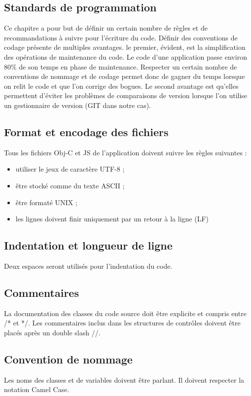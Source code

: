 \documentclass[a4paper,12pt]{report}
\begin{document}
\begin{onehalfspace}
\chapter{Standards de programmation}

Ce chapitre a pour but de définir un certain nombre de règles et de recommandations à suivre pour l'écriture du code. Définir des conventions de codage présente de multiples avantages. le premier, évident, est la simplification des opérations de maintenance du code. Le code d'une application passe environ 80\% de son temps en phase de maintenance. Respecter un certain nombre de conventions de nommage et de codage permet donc de gagner du temps lorsque on relit le code et que l'on corrige des bogues. Le second avantage est qu'elles permettent d'éviter les problèmes de comparaisons de version lorsque l'on utilise un gestionnaire de version (GIT dans notre cas).

\section{Format et encodage des fichiers}

Tous les fichiers Obj-C et JS de l'application doivent suivre les règles suivantes :
\begin{itemize}
	\item utiliser le jeux de caractère UTF-8 ;
	\item être stocké comme du texte ASCII ;
	\item être formaté UNIX ;
	\item les lignes doivent finir uniquement par un retour à la ligne (LF)
\end{itemize}

\section{Indentation et longueur de ligne}
Deux espaces seront utilisés pour l'indentation du code. 

\section{Commentaires}

La documentation des classes du code source doit être explicite et compris entre /* et */.
Les commentaires inclus dans les structures de contrôles doivent être placés après un double slash //.

\newpage

\section{Convention de nommage}
Les noms des classes et de variables doivent être parlant. Il doivent respecter la notation Camel Case.


\end{onehalfspace}
\end{document}
